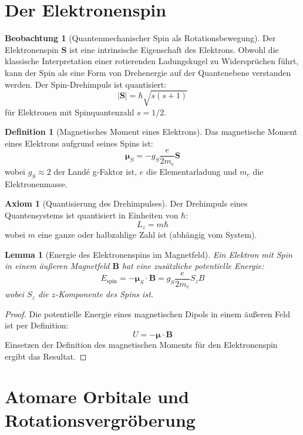 \documentclass[12pt,a4paper]{report}
\theoremstyle{plain}
\newtheorem{lemma}[theorem]{Lemma}
\theoremstyle{definition}
\newtheorem{definition}[theorem]{Definition}
\newtheorem{axiom}[theorem]{Axiom}
\newtheorem{beobachtung}[theorem]{Beobachtung}
\theoremstyle{remark}
\begin{document}
\section{Der Elektronenspin}

\begin{beobachtung}[Quantenmechanischer Spin als Rotationsbewegung]
	Der Elektronenspin $\mathbf{S}$ ist eine intrinsische Eigenschaft des Elektrons. Obwohl die klassische Interpretation einer rotierenden Ladungskugel zu Widersprüchen führt, kann der Spin als eine Form von Drehenergie auf der Quantenebene verstanden werden. Der Spin-Drehimpuls ist quantisiert:
	\[
	|\mathbf{S}| = \hbar \sqrt{s(s+1)}
	\]
	für Elektronen mit Spinquantenzahl $s = 1/2$.
\end{beobachtung}

\begin{definition}[Magnetisches Moment eines Elektrons]
	Das magnetische Moment eines Elektrons aufgrund seines Spins ist:
	\[
	\boldsymbol{\mu}_S = -g_S \frac{e}{2m_e} \mathbf{S}
	\]
	wobei $g_S \approx 2$ der Landé g-Faktor ist, $e$ die Elementarladung und $m_e$ die Elektronenmasse.
\end{definition}

\begin{axiom}[Quantisierung des Drehimpulses]
	Der Drehimpuls eines Quantensystems ist quantisiert in Einheiten von $\hbar$:
	\[
	L_z = m \hbar
	\]
	wobei $m$ eine ganze oder halbzahlige Zahl ist (abhängig vom System).
\end{axiom}

\begin{lemma}[Energie des Elektronenspins im Magnetfeld]
	Ein Elektron mit Spin in einem äußeren Magnetfeld $\mathbf{B}$ hat eine zusätzliche potentielle Energie:
	\[
	E_{\text{spin}} = -\boldsymbol{\mu}_S \cdot \mathbf{B} = g_S \frac{e}{2m_e} S_z B
	\]
	wobei $S_z$ die $z$-Komponente des Spins ist.
\end{lemma}

\begin{proof}
	Die potentielle Energie eines magnetischen Dipols in einem äußeren Feld ist per Definition:
	\[
	U = -\boldsymbol{\mu} \cdot \mathbf{B}
	\]
	Einsetzen der Definition des magnetischen Moments für den Elektronenspin ergibt das Resultat.
\end{proof}

\section{Atomare Orbitale und Rotationsvergröberung}
\end{document}
